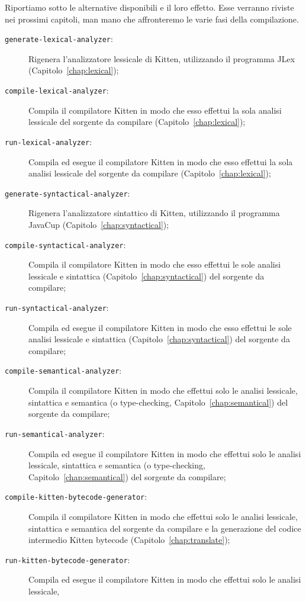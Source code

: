 Riportiamo sotto le alternative disponibili e il loro effetto. Esse verranno riviste
nei prossimi capitoli, man mano che affronteremo le varie fasi della compilazione.
%
\begin{description}
\item[\texttt{generate-lexical-analyzer}:]
  Rigenera l'analizzatore lessicale di Kitten, utilizzando il programma JLex
  (Capitolo~\ref{chap:lexical});
\item[\texttt{compile-lexical-analyzer}:]
  Compila il compilatore Kitten in modo che esso effettui
  la sola analisi lessicale
  del sorgente da compilare (Capitolo~\ref{chap:lexical});
\item[\texttt{run-lexical-analyzer}:]
  Compila ed esegue il compilatore Kitten in modo che esso effettui
  la sola analisi lessicale
  del sorgente da compilare (Capitolo~\ref{chap:lexical});
\item[\texttt{generate-syntactical-analyzer}:]
  Rigenera l'analizzatore sintattico di Kitten, utilizzando il programma JavaCup
  (Capitolo~\ref{chap:syntactical});
\item[\texttt{compile-syntactical-analyzer}:]
  Compila il compilatore Kitten in modo che esso effettui
  le sole analisi lessicale
  e sintattica (Capitolo~\ref{chap:syntactical}) del sorgente da compilare;
\item[\texttt{run-syntactical-analyzer}:]
  Compila ed esegue il compilatore Kitten in modo che esso effettui
  le sole analisi lessicale
  e sintattica (Capitolo~\ref{chap:syntactical}) del sorgente da compilare;
\item[\texttt{compile-semantical-analyzer}:]
  Compila il compilatore Kitten in modo che effettui solo le analisi lessicale,
  sintattica e semantica (o type-checking,
  Capitolo~\ref{chap:semantical}) del sorgente da compilare;
\item[\texttt{run-semantical-analyzer}:]
  Compila ed esegue il compilatore Kitten in modo che effettui solo le analisi lessicale,
  sintattica e semantica (o type-checking,
  Capitolo~\ref{chap:semantical}) del sorgente da compilare;
\item[\texttt{compile-kitten-bytecode-generator}:]
  Compila il compilatore Kitten in modo che effettui solo le analisi lessicale,
  sintattica e semantica del sorgente da compilare e la generazione del
  codice intermedio Kitten bytecode (Capitolo~\ref{chap:translate});
\item[\texttt{run-kitten-bytecode-generator}:]
  Compila ed esegue il compilatore Kitten in modo che effettui solo le analisi lessicale,

\end{description}
